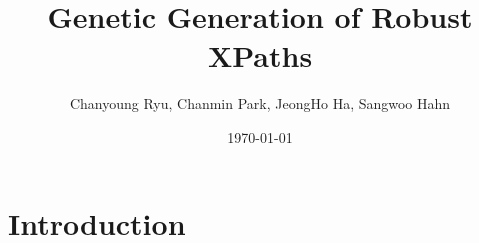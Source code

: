 \documentclass[12pt]{article}
\title{Genetic Generation of Robust XPaths}
\author{\footnotesize Chanyoung Ryu, Chanmin Park, JeongHo Ha, Sangwoo Hahn}
\date{\today}
\begin{document}
\maketitle

\begin{abstract}

\end{abstract}

\section{Introduction}
\end{document}
